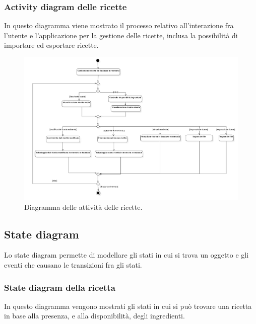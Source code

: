 \documentclass{article}
\begin{document}
\subsubsection{Activity diagram delle ricette}

In questo diagramma viene mostrato il processo relativo all'interazione fra l'utente e l'applicazione per la gestione delle ricette, inclusa la possibilità di importare ed esportare ricette.

\begin{figure}[H]
    \includegraphics[width=\linewidth]{images/activity-recipe.png}
    \caption{Diagramma delle attività delle ricette.}
    \label{fig:actrecipe}
\end{figure}

\subsection{State diagram}

Lo state diagram permette di modellare gli stati in cui si trova un oggetto e gli eventi che causano le transizioni fra gli stati. 

\subsubsection{State diagram della ricetta}

In questo diagramma vengono mostrati gli stati in cui si può trovare una ricetta in base alla presenza, e alla disponibilità, degli ingredienti.
\end{document}
